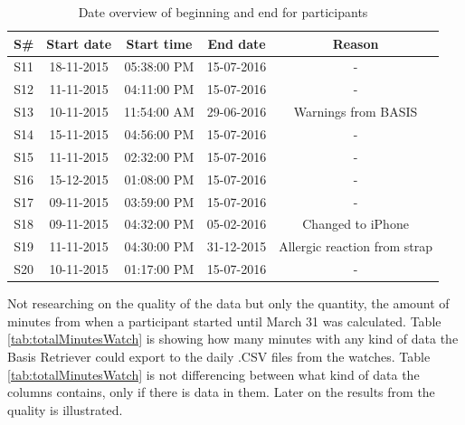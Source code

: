 \documentclass[12pt]{article} %
\begin{document}
\begin{table}[H]
\center
\begin{footnotesize}
	\begin{tabular}{| c | c | c | c | c |}
	\hline
	\textbf{S\#} & \textbf{Start date} & \textbf{Start time} & \textbf{End date} & \textbf{Reason} \\
	
	\hline
	S11 & 18-11-2015 & 05:38:00 PM & 15-07-2016 & -\\
	S12 & 11-11-2015 & 04:11:00 PM & 15-07-2016 & -\\
	S13 & 10-11-2015 & 11:54:00 AM & 29-06-2016 & Warnings from BASIS\\
	S14 & 15-11-2015 & 04:56:00 PM & 15-07-2016 & -\\
	S15 & 11-11-2015 & 02:32:00 PM & 15-07-2016 & -\\
	S16 & 15-12-2015 & 01:08:00 PM & 15-07-2016 & -\\
	S17 & 09-11-2015 & 03:59:00 PM & 15-07-2016 & -\\
	S18 & 09-11-2015 & 04:32:00 PM & 05-02-2016 & Changed to iPhone\\
	S19 & 11-11-2015 & 04:30:00 PM & 31-12-2015 & Allergic reaction from strap\\
	S20 & 10-11-2015 & 01:17:00 PM & 15-07-2016 & -\\
	\hline
	\end{tabular}
	\caption{Date overview of beginning and end for participants}
	\label{tab:beginning}
\end{footnotesize}
\end{table}

Not researching on the quality of the data but only the quantity, the amount of minutes from when a participant started until March 31 was calculated. Table \ref{tab:totalMinutesWatch} is showing how many minutes with any kind of data the Basis Retriever could export to the daily .CSV files from the watches. Table \ref{tab:totalMinutesWatch} is not differencing between what kind of data the columns contains, only if there is data in them. Later on the results from the quality is illustrated. 
\end{document}
